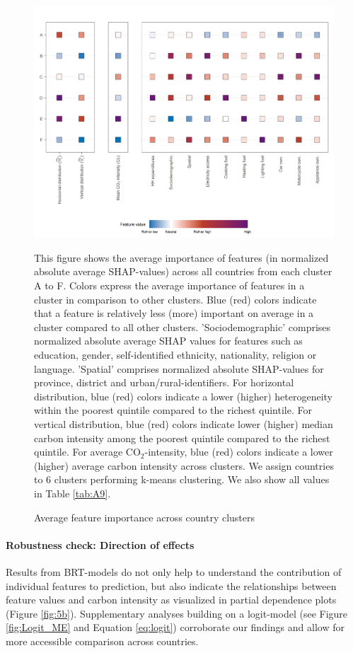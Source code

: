 \documentclass[12pt, a4paper]{article}
\newenvironment{subcaption2}
{\strut
\vspace{-5pt}
\begin{minipage}[b]{0.9\textwidth}
  \hspace*{-\parindent}
  \footnotesize}
 {\end{minipage}}
\begin{document}
\begin{figure}[ht!]
    \centering
    \includegraphics{1_Figures/Figure 3/Figure_3_Corrected.jpg}
    \caption{Average feature importance across country clusters}
    \label{fig:fig_3}
    \begin{subcaption2}
    This figure shows the average importance of features (in normalized absolute average SHAP-values) across all countries from each cluster A to F. Colors express the average importance of features in a cluster in comparison to other clusters. Blue (red) colors indicate that a feature is relatively less (more) important on average in a cluster compared to all other clusters. 'Sociodemographic' comprises normalized absolute average SHAP values for features such as education, gender, self-identified ethnicity, nationality, religion or language. 'Spatial' comprises normalized absolute SHAP-values for province, district and urban/rural-identifiers. For horizontal distribution, blue (red) colors indicate a lower (higher) heterogeneity within the poorest quintile compared to the richest quintile. For vertical distribution, blue (red) colors indicate lower (higher) median carbon intensity among the poorest quintile compared to the richest quintile. For average CO$_{2}$-intensity, blue (red) colors indicate a lower (higher) average carbon intensity across clusters. We assign countries to 6 clusters performing k-means clustering. We also show all values in Table \ref{tab:A9}.
    \end{subcaption2}
\end{figure}

\paragraph{Robustness check: Direction of effects}
Results from BRT-models do not only help to understand the contribution of individual features to prediction, but also indicate the relationships between feature values and carbon intensity as visualized in partial dependence plots (Figure \ref{fig:5b}). Supplementary analyses building on a logit-model (see Figure \ref{fig:Logit_ME} and Equation \ref{eq:logit}) corroborate our findings and allow for more accessible comparison across countries.
\end{document}

